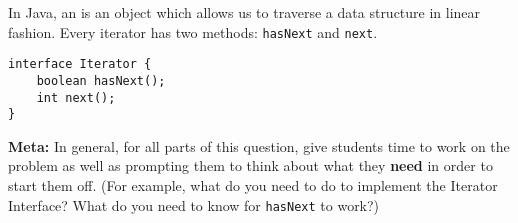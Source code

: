 In Java, an  is an object which allows us to traverse a data structure in linear fashion. Every iterator has two methods: \texttt{hasNext} and \texttt{next}.

\begin{lstlisting}
interface Iterator {
    boolean hasNext();
    int next();
}
\end{lstlisting}

\begin{solution}
\textbf{Meta:} In general, for all parts of this question, give students time
to work on the problem as well as prompting them to think about what they
\textbf{need} in order to start them off. (For example, what do you need to do
to implement the Iterator Interface? What do you need to know for
\lstinline$hasNext$ to work?)
\end{solution}
